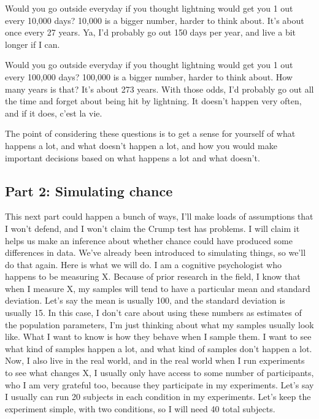 \documentclass[
]{book}
\begin{document}
Would you go outside everyday if you thought lightning would get you 1 out every 10,000 days? 10,000 is a bigger number, harder to think about. It's about once every 27 years. Ya, I'd probably go out 150 days per year, and live a bit longer if I can.

Would you go outside everyday if you thought lightning would get you 1 out every 100,000 days? 100,000 is a bigger number, harder to think about. How many years is that? It's about 273 years. With those odds, I'd probably go out all the time and forget about being hit by lightning. It doesn't happen very often, and if it does, c'est la vie.

The point of considering these questions is to get a sense for yourself of what happens a lot, and what doesn't happen a lot, and how you would make important decisions based on what happens a lot and what doesn't.

\subsection{Part 2: Simulating chance}\label{part-2-simulating-chance}

This next part could happen a bunch of ways, I'll make loads of assumptions that I won't defend, and I won't claim the Crump test has problems. I will claim it helps us make an inference about whether chance could have produced some differences in data. We've already been introduced to simulating things, so we'll do that again. Here is what we will do. I am a cognitive psychologist who happens to be measuring X. Because of prior research in the field, I know that when I measure X, my samples will tend to have a particular mean and standard deviation. Let's say the mean is usually 100, and the standard deviation is usually 15. In this case, I don't care about using these numbers as estimates of the population parameters, I'm just thinking about what my samples usually look like. What I want to know is how they behave when I sample them. I want to see what kind of samples happen a lot, and what kind of samples don't happen a lot. Now, I also live in the real world, and in the real world when I run experiments to see what changes X, I usually only have access to some number of participants, who I am very grateful too, because they participate in my experiments. Let's say I usually can run 20 subjects in each condition in my experiments. Let's keep the experiment simple, with two conditions, so I will need 40 total subjects.
\end{document}
